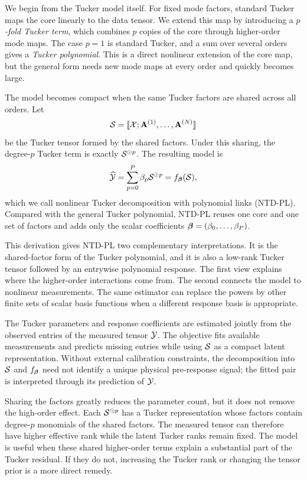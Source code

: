 We begin from the Tucker model itself. For fixed mode factors, standard Tucker
maps the core linearly to the data tensor. We extend this map by introducing a
\emph{$p$-fold Tucker term}, which combines $p$ copies of the core through
higher-order mode maps. The case $p=1$ is standard Tucker, and a sum over
several orders gives a \emph{Tucker polynomial}. This is a direct nonlinear
extension of the core map, but the general form needs new mode maps at every
order and quickly becomes large.

The model becomes compact when the same Tucker factors are shared across all
orders. Let
\begin{equation}
  \mathcal{S} =
  [\![ \mathcal{X}; \mathbf{A}^{(1)},\ldots,\mathbf{A}^{(N)} ]\!]
\end{equation}
be the Tucker tensor formed by the shared factors. Under this sharing, the
degree-$p$ Tucker term is exactly $\mathcal{S}^{\odot p}$. The resulting model is
\begin{equation}
  \widehat{\mathcal{Y}}
  =
  \sum_{p=0}^{P}\beta_p\mathcal{S}^{\odot p}
  =
  f_{\boldsymbol{\beta}}(\mathcal{S}),
  \label{eq:intro_ntdpl}
\end{equation}
which we call nonlinear Tucker decomposition with polynomial links (NTD-PL).
Compared with the general Tucker polynomial, NTD-PL reuses one core and one set
of factors and adds only the scalar coefficients
$\boldsymbol{\beta}=(\beta_0,\ldots,\beta_P)$.

This derivation gives NTD-PL two complementary interpretations. It is the
shared-factor form of the Tucker polynomial, and it is also a low-rank Tucker
tensor followed by an entrywise polynomial response. The first view explains
where the higher-order interactions come from. The second connects the model
to nonlinear measurements. The same estimator can replace the powers by other
finite sets of scalar basis functions when a different response basis is
appropriate.

The Tucker parameters and response coefficients are estimated jointly from the
observed entries of the measured tensor $\mathcal{Y}$. The objective fits available
measurements and predicts missing entries while using $\mathcal{S}$ as a compact latent
representation. Without external calibration constraints, the decomposition
into $\mathcal{S}$ and $f_{\boldsymbol{\beta}}$ need not identify a unique physical pre-response
signal; the fitted pair is interpreted through its prediction of $\mathcal{Y}$.

Sharing the factors greatly reduces the parameter count, but it does not remove
the high-order effect. Each $\mathcal{S}^{\odot p}$ has a Tucker representation whose
factors contain degree-$p$ monomials of the shared factors. The measured tensor
can therefore have higher effective rank while the latent Tucker ranks remain
fixed. The model is useful when these shared higher-order terms explain a
substantial part of the Tucker residual. If they do not, increasing the Tucker
rank or changing the tensor prior is a more direct remedy.

